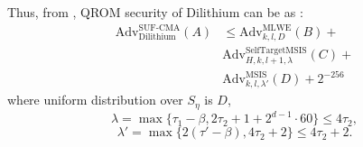 \documentclass[lettersize,journal]{IEEEtran}
\begin{document}
Thus, from \cite{kiltzConcreteTreatmentFiatShamir2017a},
QROM security of Dilithium can be as \cite{ducasCRYSTALSDilithiumLatticeBasedDigital2018}:
\begin{align*}
    \text{Adv}^{\text{SUF-CMA}}_{\text{Dilithium}}(A) 
    & \leq \text{Adv}^{\text{MLWE}}_{k, l ,D}(B) + \\
    & \text{Adv}^{\text{SelfTargetMSIS}}_{H,k,l+1,\lambda}(C) + \\
     & \text{Adv}^{\text{MSIS}}_{k, l ,\lambda'}(D) + 2^{-256}
\end{align*}
where uniform distribution over $S_\eta$ is $D$,
$$\lambda = \max\{\tau_1 - \beta, 2\tau_2 + 1 + 
2^{d-1}\cdot 60\} \leq 4\tau_2,$$
$$\lambda' = \max\{2(\tau' - \beta), 4\tau_2 + 2\} 
\leq 4\tau_2 + 2.$$


    

\end{document}
